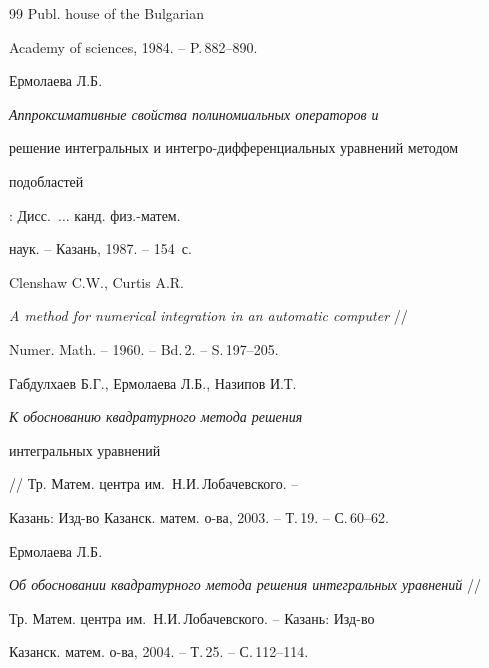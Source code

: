 \begin{thebibliography}{99}
Publ. house of the Bulgarian


Academy of sciences, 1984. -- P.\,882--890.







Ермолаева Л.Б. {\it  Аппроксимативные свойства полиномиальных операторов и  


решение  интегральных и интегро-дифференциальных уравнений методом 


подобластей}: Дисс.~$\dotsc$  канд. физ.-матем.


наук. -- Казань, 1987. -- 154~с.







Clenshaw C.W., Curtis A.R. 


{\it A method for numerical integration in an automatic computer} //


Numer. Math. -- 1960. -- Bd.\,2. -- S.\,197--205.







Габдулхаев Б.Г., Ермолаева Л.Б., Назипов И.Т. 


{\it К обоснованию квадратурного метода решения


интегральных уравнений} // Тр. Матем. центра им.~Н.И.\,Лобачевского. --


Казань: Изд-во Казанск. матем. о-ва, 2003. -- Т.\,19. -- С.\,60--62.







Ермолаева Л.Б. 


{\it Об обосновании квадратурного метода решения интегральных уравнений} //


Тр. Матем. центра им.~Н.И.\,Лобачевского. -- Казань: Изд-во


Казанск. матем. о-ва, 2004. -- Т.\,25. -- С.\,112--114.





\end{thebibliography}





\vskip 2cm












\label{end}





